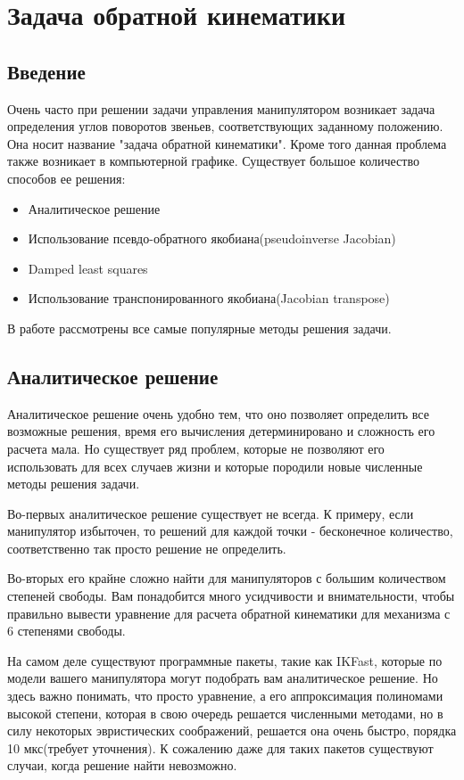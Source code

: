 \chapter{Задача обратной кинематики} \label{ch:3}


\section{Введение} \label{sect:3_1}
Очень часто при решении задачи управления манипулятором возникает задача определения углов поворотов звеньев, соответствующих заданному положению. Она носит название "задача обратной кинематики". Кроме того данная проблема также возникает в компьютерной графике. Существует большое количество способов ее решения:
\begin{itemize}
	\item Аналитическое решение
	\item Использование псевдо-обратного якобиана(pseudoinverse Jacobian)
	\item Damped least squares
	\item Использование транспонированного якобиана(Jacobian transpose)
\end{itemize}

В работе рассмотрены все самые популярные методы решения задачи.


\section{Аналитическое решение} \label{sect:3_2}
Аналитическое решение очень удобно тем, что оно позволяет определить все возможные решения, время его вычисления детерминировано и сложность его расчета мала. Но существует ряд проблем, которые не позволяют его использовать для всех случаев жизни и которые породили новые численные методы решения задачи.

Во-первых аналитическое решение существует не всегда. К примеру, если манипулятор избыточен, то решений для каждой точки - бесконечное количество, соответственно так просто решение не определить.

Во-вторых его крайне сложно найти для манипуляторов с большим количеством степеней свободы. Вам понадобится много усидчивости и внимательности, чтобы правильно вывести уравнение для расчета обратной кинематики для механизма с 6 степенями свободы.

На самом деле существуют программные пакеты, такие как IKFast, которые по модели вашего манипулятора могут подобрать вам аналитическое решение. Но здесь важно понимать, что просто уравнение, а его аппроксимация полиномами высокой степени, которая в свою очередь решается численными методами, но в силу некоторых эвристических соображений, решается она очень быстро, порядка 10 мкс(требует уточнения)\cite{IKFast}. К сожалению даже для таких пакетов существуют случаи, когда решение найти невозможно.

